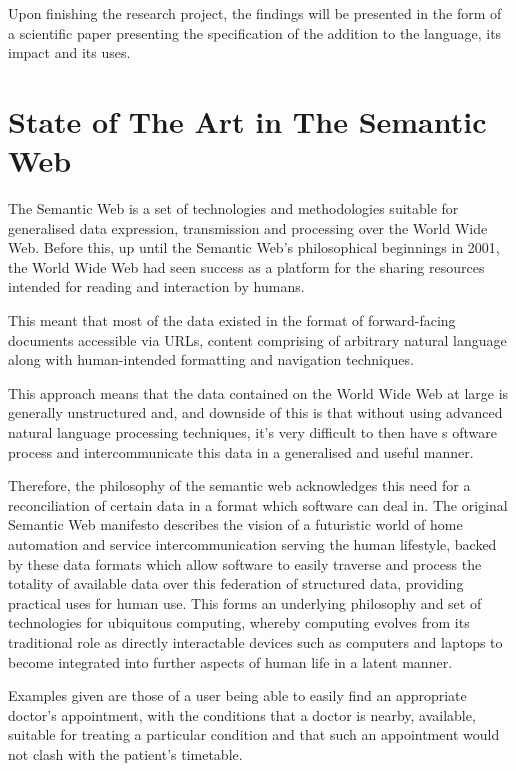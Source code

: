 \documentclass{article}
\begin{document}
Upon finishing the research project, the findings will be presented in the form
of a scientific paper presenting the specification of the addition to the
language, its impact and its uses.

\section{State of The Art in The Semantic Web}

The Semantic Web is a set of technologies and methodologies suitable for
generalised data expression, transmission and processing over the World Wide
Web. Before this, up until the Semantic Web's philosophical beginnings in
2001, the World Wide Web had seen success as a platform for the
sharing resources intended for reading and interaction by humans.

This meant that most of the data existed in the format of forward-facing 
documents accessible via URLs, content comprising of arbitrary natural language
along with human-intended formatting and navigation techniques.

This approach means that the data contained on the World Wide Web at large is
generally unstructured and, and downside of this is that without using advanced 
natural language  processing techniques, it's very difficult to then have s
oftware process and intercommunicate this data in a generalised and useful manner.

Therefore, the philosophy of the semantic web acknowledges this need for a
reconciliation of certain data in a format which software can deal in. The
original Semantic Web manifesto\cite{semweb} describes the vision of a 
futuristic world of home automation and service intercommunication serving 
the human lifestyle, backed by these data formats which allow software to 
easily traverse and process the totality of available data over this federation
of structured data, providing practical uses for human use. This forms an
underlying philosophy and set of technologies for ubiquitous computing,
whereby computing evolves from its traditional role as directly interactable
devices such as computers and laptops to become integrated into further
aspects of human life in a latent manner.

Examples given are those of a user being able to easily find an appropriate
doctor's appointment, with the conditions that a doctor is nearby, available, 
suitable for treating a particular condition and that such an appointment would
not clash with the patient's timetable.
\end{document}
